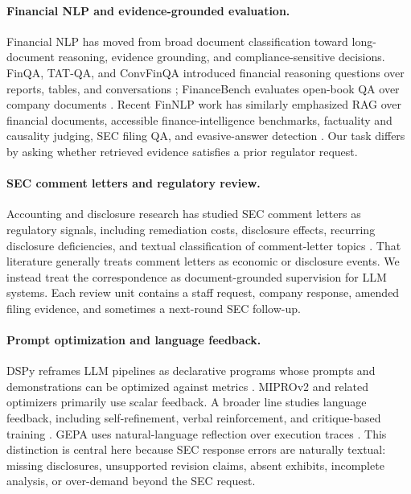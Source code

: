 \documentclass[11pt]{article}
\begin{document}
\paragraph{Financial NLP and evidence-grounded evaluation.}
Financial NLP has moved from broad document classification toward long-document reasoning, evidence grounding, and compliance-sensitive decisions. FinQA, TAT-QA, and ConvFinQA introduced financial reasoning questions over reports, tables, and conversations \citep{chen2021finqa,zhu2021tatqa,chen2022convfinqa}; FinanceBench evaluates open-book QA over company documents \citep{islam2023financebench}. Recent FinNLP work has similarly emphasized RAG over financial documents, accessible finance-intelligence benchmarks, factuality and causality judging, SEC filing QA, and evasive-answer detection \citep{lithgow2025rag,klimaszewski2025avenibench,lai2025secqa,nuaimi2025evasive,wu2025nli}. Our task differs by asking whether retrieved evidence satisfies a prior regulator request.

\paragraph{SEC comment letters and regulatory review.}
Accounting and disclosure research has studied SEC comment letters as regulatory signals, including remediation costs, disclosure effects, recurring disclosure deficiencies, and textual classification of comment-letter topics \citep{cassell2013sec,bozanic2017sec,baugh2023auditor,ryans2021comment}. That literature generally treats comment letters as economic or disclosure events. We instead treat the correspondence as document-grounded supervision for LLM systems. Each review unit contains a staff request, company response, amended filing evidence, and sometimes a next-round SEC follow-up.

\paragraph{Prompt optimization and language feedback.}
DSPy reframes LLM pipelines as declarative programs whose prompts and demonstrations can be optimized against metrics \citep{khattab2023dspy}. MIPROv2 and related optimizers primarily use scalar feedback. A broader line studies language feedback, including self-refinement, verbal reinforcement, and critique-based training \citep{scheurer2022language,madaan2023selfrefine,shinn2023reflexion}. GEPA uses natural-language reflection over execution traces \citep{agrawal2026gepa}. This distinction is central here because SEC response errors are naturally textual: missing disclosures, unsupported revision claims, absent exhibits, incomplete analysis, or over-demand beyond the SEC request.
\end{document}
